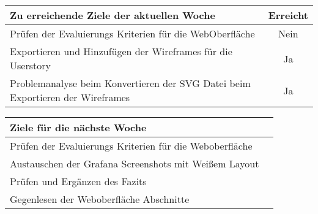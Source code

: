 \begin{tabularx}{\textwidth}{Xc}
    \arrayrulecolor{OliveGreen}
    \toprule
    {\bfseries Zu erreichende Ziele der aktuellen Woche} & {\bfseries Erreicht} \\
    \midrule[2pt]
    Prüfen der Evaluierungs Kriterien für die WebOberfläche &Nein            \\
    \rowcolor{OliveGreen!15}
    Exportieren und Hinzufügen der Wireframes für die Userstory      &Ja     \\
    \rowcolor{White}
    Problemanalyse beim Konvertieren der SVG Datei beim Exportieren der
    Wireframes                                              &Ja              \\
    \bottomrule[2pt]
\end{tabularx}
%
\vspace{1cm}
%
\begin{tabularx}{\textwidth}{Xc}
    \arrayrulecolor{OliveGreen}
    \toprule
    {\bfseries Ziele für die nächste Woche}        &                         \\
    \midrule[2pt]
    Prüfen der Evaluierungs Kriterien für die Weboberfläche    &             \\
    \rowcolor{OliveGreen!15}
    Austauschen der Grafana Screenshots mit Weißem Layout  &                 \\
    \rowcolor{White}
    Prüfen und Ergänzen des Fazits                         &                 \\
    \rowcolor{OliveGreen!15}
    Gegenlesen der Weboberfläche Abschnitte               &                  \\
\end{tabularx}
